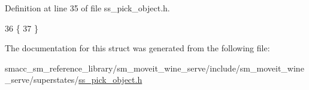 Definition at line 35 of file ss\+\_\+pick\+\_\+object.\+h.


\begin{DoxyCode}
36             \{
37             \}
\end{DoxyCode}


The documentation for this struct was generated from the following file\+:\begin{DoxyCompactItemize}
\item 
smacc\+\_\+sm\+\_\+reference\+\_\+library/sm\+\_\+moveit\+\_\+wine\+\_\+serve/include/sm\+\_\+moveit\+\_\+wine\+\_\+serve/superstates/\hyperlink{sm__moveit__wine__serve_2include_2sm__moveit__wine__serve_2superstates_2ss__pick__object_8h}{ss\+\_\+pick\+\_\+object.\+h}\end{DoxyCompactItemize}

